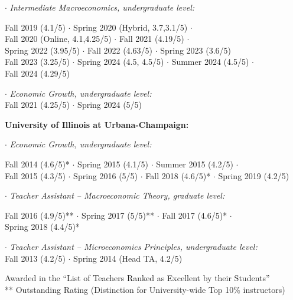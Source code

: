 \documentclass[mm, 10pt]{simple_style}
\begin{document}
\begin{resume}
$\cdot$  \textit{Intermediate Macroeconomics, undergraduate level:}\\
\indent \hspace{1cm}  \begin{minipage}[t]{0.75\textwidth}
Fall 2019 (4.1/5) $\cdot$ Spring 2020 (Hybrid, 3.7,3.1/5) $\cdot$ \\
Fall 2020 (Online, 4.1,4.25/5) $\cdot$ Fall 2021 (4.19/5) $\cdot$ \\
Spring 2022 (3.95/5) $\cdot$ Fall 2022 (4.63/5) $\cdot$ Spring 2023 (3.6/5) \\
Fall 2023 (3.25/5) $\cdot$ Spring 2024 (4.5, 4.5/5) $\cdot$ Summer 2024 (4.5/5) $\cdot$ \\
Fall 2024 (4.29/5)
\end{minipage}

$\cdot$  \textit{Economic Growth, undergraduate level:} \\
\indent \hspace{1cm}  Fall 2021 (4.25/5) $\cdot$ Spring 2024 (5/5)

\textbf{University of Illinois at Urbana-Champaign:}

$\cdot$ \textit{Economic Growth, undergraduate level:} \\
\indent \hspace{1cm}  \begin{minipage}[t]{0.8\textwidth}
Fall 2014 (4.6/5)* $\cdot$ Spring 2015 (4.1/5) $\cdot$ Summer 2015 (4.2/5) $\cdot$ \\
Fall 2015 (4.3/5) $\cdot$ Spring 2016 (5/5) $\cdot$ Fall 2018 (4.6/5)* $\cdot$ Spring 2019 (4.2/5)
\end{minipage}

$\cdot$ \textit{Teacher Assistant -- Macroeconomic Theory, graduate level:} \\
\indent \hspace{1cm}  \begin{minipage}[t]{0.75\textwidth}
Fall 2016 (4.9/5)** $\cdot$ Spring 2017 (5/5)** $\cdot$ Fall 2017 (4.6/5)* $\cdot$ \\
Spring 2018 (4.4/5)*
\end{minipage}

$\cdot$ \textit{Teacher Assistant -- Microeconomics Principles, undergraduate level:} \\
\indent \hspace{1cm}  Fall 2013 (4.2/5) $\cdot$ Spring 2014 (Head TA, 4.2/5)

{\small * Awarded in the ``List of Teachers Ranked as Excellent by their Students'' \\
** Outstanding Rating (Distinction for University-wide Top 10\% instructors)}


\end{resume}
\end{document}
